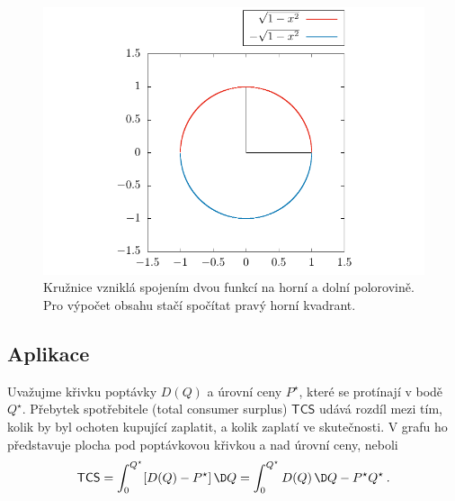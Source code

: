 \begin{example}
    \begin{figure}[h]
        \centering
        \includegraphics[scale = 0.8]{Gnuplot/Figures/priklad-kruh-obr.pdf}
        \caption{Kružnice vzniklá spojením dvou funkcí na horní a dolní polorovině. Pro výpočet obsahu stačí spočítat pravý horní kvadrant.}
        \label{fig:obsah-kruhu}
    \end{figure}


\end{example}

\subsection*{Aplikace}

\begin{example}
    Uvažujme křivku poptávky $D(Q)$ a úrovní ceny $P^\star$, které se protínají v bodě $Q^\star$. Přebytek spotřebitele (total consumer surplus) $\mathsf{TCS}$ udává rozdíl mezi tím, kolik by byl ochoten kupující zaplatit, a kolik zaplatí ve skutečnosti. V grafu ho představuje plocha pod poptávkovou křivkou a nad úrovní ceny, neboli \begin{align}
        \mathsf{TCS} = \int_0^{Q^\star} [D(Q) - P^\star] \, \D Q = \int_0^{Q^\star} D(Q) \, \D Q  - P^\star Q^\star \:.
    \end{align}
\end{example}

